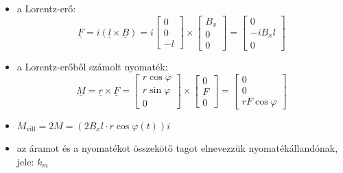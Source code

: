 \begin{itemize}
    \item a Lorentz-erő:
    $$ \underline{F} = i(\underline{l} \times \underline{B}) = i \begin{bmatrix} 0 \\ 0 \\ -l \end{bmatrix} \times \begin{bmatrix} B_x \\ 0 \\ 0 \end{bmatrix} = \begin{bmatrix} 0 \\ -iB_x l \\ 0 \end{bmatrix} $$
    \item a Lorentz-erőből számolt nyomaték:
    $$ \underline{M} = \underline{r} \times \underline{F} = \begin{bmatrix} r \cos\varphi \\ r \sin\varphi \\ 0 \end{bmatrix} \times \begin{bmatrix} 0 \\ F \\ 0 \end{bmatrix} = \begin{bmatrix} 0 \\ 0 \\ r F \cos\varphi \end{bmatrix} $$
    \item $M_{\text{vill}} = 2M = (2 B_x l \cdot r \cos\varphi(t)) i$
    \item az áramot és a nyomatékot összekötő tagot elnevezzük nyomatékállandónak, jele: $k_m$
\end{itemize}
